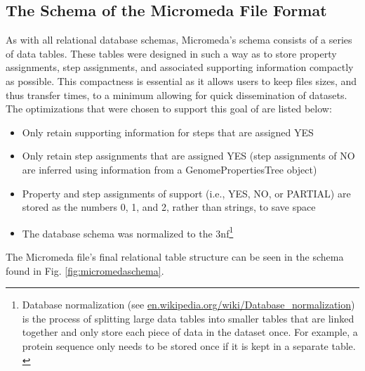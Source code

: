 \subsection{The Schema of the Micromeda File Format}

As with all relational database schemas, Micromeda's schema consists of a series of data tables. These tables were designed in such a way as to store property assignments, step assignments, and associated supporting information compactly as possible. This compactness is essential as it allows users to keep files sizes, and thus transfer times, to a minimum allowing for quick dissemination of datasets. The optimizations that were chosen to support this goal of are listed below:

\begin{itemize}
\item Only retain supporting information for steps that are assigned YES
\item Only retain step assignments that are assigned YES (step assignments of NO are inferred using information from a GenomePropertiesTree object)
\item Property and step assignments of support (i.e., YES, NO, or PARTIAL) are stored as the numbers 0, 1, and 2, rather than strings, to save space
\item The database schema was normalized to the \gls{3nf}\footnote{Database normalization (see \href{http://en.wikipedia.org/wiki/Database_normalization}{en.wikipedia.org/wiki/Database\_normalization}) is the process of splitting large data tables into smaller tables that are linked together and only store each piece of data in the dataset once. For example, a protein sequence only needs to be stored once if it is kept in a separate table. \label{normalization-note}} \cite{beeri1989sophisticate} 
\end{itemize}

The Micromeda file's final relational table structure can be seen in the schema found in Fig. \ref{fig:micromedaschema}.

